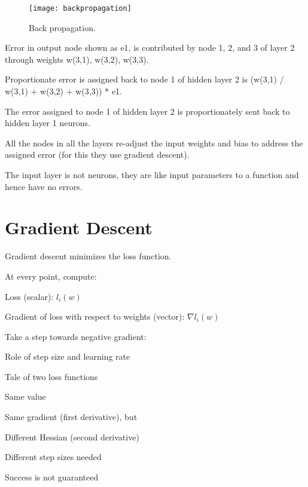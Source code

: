  	\begin{figure}[h]
		\centering
		\texttt{[image: backpropagation]}
		\caption[Back propagation]{Back propagation.}
		\label{fig:backpropagation}
	\end{figure}

	\begin{bulletedlist}
		\item Error in output node shown as e1, is contributed by node 1, 2, and 3 of layer 2 through weights w(3,1), w(3,2), w(3,3).
		\item Proportionate error is assigned back to node 1 of hidden layer 2 is (w(3,1) / w(3,1) + w(3,2) + w(3,3)) * e1.
		\item The error assigned to node 1 of hidden layer 2 is proportionately sent back to hidden layer 1 neurons.
		\item All the nodes in all the layers re-adjust the input weights and bias to address the assigned error (for this they use gradient descent).
		\item The input layer is not neurons, they are like input parameters to a function and hence have no errors.
	\end{bulletedlist}


	\section{Gradient Descent}

	\begin{bulletedlist}
		\item Gradient descent minimizes the loss function.
		\item At every point, compute:
		\begin{bulletedlist}
			\item Loss (scalar): $l_i(w)$
			\item Gradient of loss with respect to weights (vector): $\nabla l_i(w)$
			\item Take a step towards negative gradient:
		\end{bulletedlist}
	\end{bulletedlist}

Role of step size and learning rate
	\begin{bulletedlist}
		\item Tale of two loss functions
		\begin{bulletedlist}
			\item Same value
			\item Same gradient (first derivative), but
			\item Different Hessian (second derivative)
			\item Different step sizes needed
		\end{bulletedlist}
		\item Success is not guaranteed
	\end{bulletedlist}

